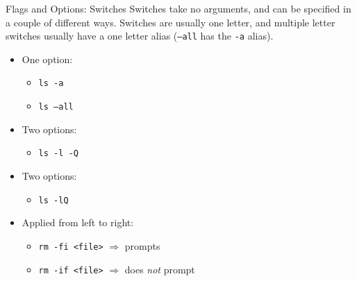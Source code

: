 \documentclass[11pt]{beamer}
\begin{document}
\begin{frame}[fragile]{Flags and Options: Switches}
  Switches take no arguments, and can be specified in a couple of different ways.  Switches are usually
  one letter, and multiple letter switches usually have a one letter alias (\texttt{--all} has the \texttt{-a} alias).
  \begin{itemize}
    \item One option:
    \begin{itemize}
      \item \texttt{ls -a}
      \item \texttt{ls --all}
    \end{itemize}
    \item Two options:
    \begin{itemize}
      \item \texttt{ls -l -Q}
    \end{itemize}
    \item Two options:
    \begin{itemize}
      \item \texttt{ls -lQ}
    \end{itemize}
    \item Applied from left to right:
    \begin{itemize}
      \item \texttt{rm -fi <file>} $\Rightarrow$ prompts
      \item \texttt{rm -if <file>} $\Rightarrow$ does \emph{not} prompt
    \end{itemize}
  \end{itemize}
\end{frame}
\end{document}
